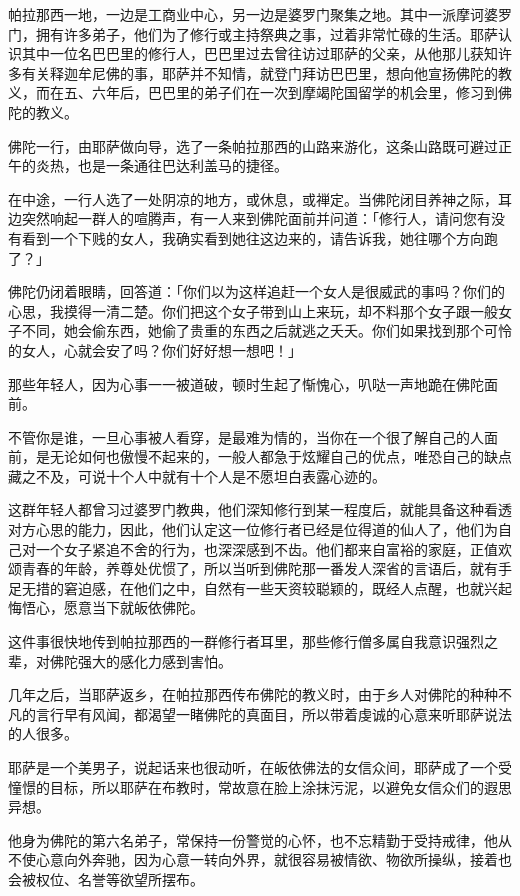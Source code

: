 \documentclass[twoside,openany]{book}
\begin{document}
帕拉那西一地，一边是工商业中心，另一边是婆罗门聚集之地。其中一派摩诃婆罗门，拥有许多弟子，他们为了修行或主持祭典之事，过着非常忙碌的生活。耶萨认识其中一位名巴巴里的修行人，巴巴里过去曾往访过耶萨的父亲，从他那儿获知许多有关释迦牟尼佛的事，耶萨并不知情，就登门拜访巴巴里，想向他宣扬佛陀的教义，而在五、六年后，巴巴里的弟子们在一次到摩竭陀国留学的机会里，修习到佛陀的教义。

佛陀一行，由耶萨做向导，选了一条帕拉那西的山路来游化，这条山路既可避过正午的炎热，也是一条通往巴达利盖马的捷径。

在中途，一行人选了一处阴凉的地方，或休息，或禅定。当佛陀闭目养神之际，耳边突然响起一群人的喧腾声，有一人来到佛陀面前并问道：「修行人，请问您有没有看到一个下贱的女人，我确实看到她往这边来的，请告诉我，她往哪个方向跑了？」

佛陀仍闭着眼睛，回答道：「你们以为这样追赶一个女人是很威武的事吗？你们的心思，我摸得一清二楚。你们把这个女子带到山上来玩，却不料那个女子跟一般女子不同，她会偷东西，她偷了贵重的东西之后就逃之夭夭。你们如果找到那个可怜的女人，心就会安了吗？你们好好想一想吧！」

那些年轻人，因为心事一一被道破，顿时生起了惭愧心，叭哒一声地跪在佛陀面前。

不管你是谁，一旦心事被人看穿，是最难为情的，当你在一个很了解自己的人面前，是无论如何也傲慢不起来的，一般人都急于炫耀自己的优点，唯恐自己的缺点藏之不及，可说十个人中就有十个人是不愿坦白表露心迹的。

这群年轻人都曾习过婆罗门教典，他们深知修行到某一程度后，就能具备这种看透对方心思的能力，因此，他们认定这一位修行者已经是位得道的仙人了，他们为自己对一个女子紧追不舍的行为，也深深感到不齿。他们都来自富裕的家庭，正值欢颂青春的年龄，养尊处优惯了，所以当听到佛陀那一番发人深省的言语后，就有手足无措的窘迫感，在他们之中，自然有一些天资较聪颖的，既经人点醒，也就兴起悔悟心，愿意当下就皈依佛陀。

这件事很快地传到帕拉那西的一群修行者耳里，那些修行僧多属自我意识强烈之辈，对佛陀强大的感化力感到害怕。

几年之后，当耶萨返乡，在帕拉那西传布佛陀的教义时，由于乡人对佛陀的种种不凡的言行早有风闻，都渴望一睹佛陀的真面目，所以带着虔诚的心意来听耶萨说法的人很多。

耶萨是一个美男子，说起话来也很动听，在皈依佛法的女信众间，耶萨成了一个受憧憬的目标，所以耶萨在布教时，常故意在脸上涂抹污泥，以避免女信众们的遐思异想。

他身为佛陀的第六名弟子，常保持一份警觉的心怀，也不忘精勤于受持戒律，他从不使心意向外奔驰，因为心意一转向外界，就很容易被情欲、物欲所操纵，接着也会被权位、名誉等欲望所摆布。
\end{document}
